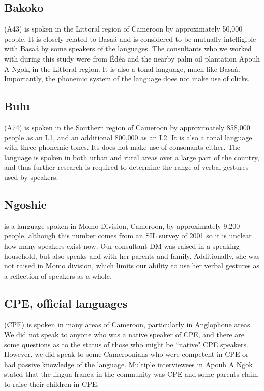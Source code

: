 \documentclass[output=paper
,newtxmath
,modfonts
,nonflat]{langsci/langscibook}
\begin{document}
\subsection{Bakoko}

 (A43) is spoken in the Littoral region of Cameroon by approximately 50,000 people. It is closely related to Basa\'a and is considered to be mutually intelligible with Basa\'a by some speakers of the languages. The  consultants who we worked with during this study were from \'Ed\'ea and the nearby palm oil plantation Apouh A Ngok, in the Littoral region. It is also a tonal language, much like Basa\'a. Importantly, the phonemic system of the language does not make use of clicks. 

\subsection{Bulu}

 (A74) is spoken in the Southern region of Cameroon by approximately 858,000 people as an L1, and an additional 800,000 as an L2. It is also a tonal language with three phonemic tones. Its  does not make use of  consonants either. The language is spoken in both urban and rural areas over a large part of the country, and thus further research is required to determine the range of verbal gestures used by  speakers. 

\subsection{Ngoshie}
 is a   language spoken in Momo Division, Cameroon, by approximately 9,200 people, although this number comes from an SIL survey of 2001 \citep{lewisetal2016} so it is unclear how many speakers exist now. Our consultant DM was raised in a  speaking household, but also speaks  and  with her parents and family. Additionally, she was not raised in Momo division, which limits our ability to use her verbal gestures as a reflection of  speakers as a whole. %

\subsection{CPE, official languages}

 (CPE) is spoken in many areas of Cameroon, particularly in Anglophone areas. We did not speak to anyone who was a native speaker of CPE, and there are some questions as to the status of those who might be ``native" CPE speakers. However, we did speak to some Cameroonians who were competent in CPE or had passive knowledge of the language. Multiple interviewees in Apouh A Ngok stated that the lingua franca in the community was CPE and some parents claim to raise their children in CPE. 
\end{document}
